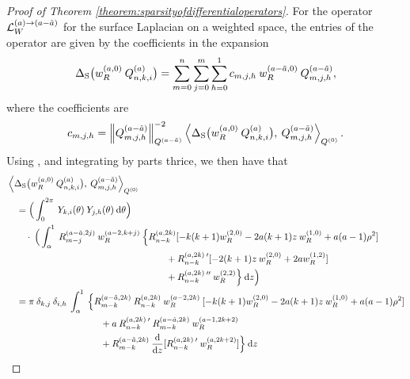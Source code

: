 \documentclass[11pt, oneside]{article}   	%
\begin{document}
\begin{proof}[Proof of Theorem \ref{theorem:sparsityofdifferentialoperators}]
For the operator $\mathcal{L}_W^{(a)\to(a-\tilde a)}$ for the surface Laplacian on a weighted space, the entries of the operator are given by the coefficients in the expansion 
\begin{align*}
	\Delta_{\rm S} \big(w_R^{(a,0)} \: Q_{n,k,i}^{(a)} \big) = \sum_{m=0}^{n} \sum_{j=0}^m \sum_{h=0}^1 c_{m,j,h} \: w_R^{(a-\tilde a,0)} \: Q_{m,j,h}^{(a - \tilde a)}, 
\end{align*}	
where the coefficients are
\begin{align*}
	c_{m,j,h} = \norm{\scopmjh^{(a - \tilde a)}}^{-2}_{\scop^{(a - \tilde a)}} \ip<\DeltaS \big(\genjacw^{(a,0)} \: \scopnki^{(a)} \big), \: \scopmjh^{(a - \tilde a)}>_{\scop^{(0)}}.
\end{align*}
Using , and integrating by parts thrice, we then have that
\begin{align*}
	&\ip<\DeltaS \big(\genjacw^{(a,0)} \: \scopnki^{(a)} \big), \: \scopmjh^{(a - \tilde a)}>_{\scop^{(0)}} \\
	&\quad = \Big( \int_0^{2\pi} \: \chki(\theta) \: \chjh(\theta) \: \D \theta \Big) \\
	&\quad \quad  \cdot \: \Big( \int_\alpha^1 \: \genjacmmj^{(a - \tilde a, 2j)} \: \genjacw^{(a - 2, k+j)} \: \Big\{\genjacnmk^{(a,2k)} [-k(k+1) \genjacw^{(2,0)} - 2a(k+1)z \: \genjacw^{(1,0)} + a (a-1) \rho^2] \\
	&\quad \quad \quad \quad \quad \quad \quad \quad \quad \quad \quad \quad \quad \quad \quad \quad \quad + \genjacnmk^{(a,2k) \: \prime} [-2(k+1) z \: \genjacw^{(2,0)} + 2a \genjacw^{(1,2)}] \\
	&\quad \quad \quad \quad \quad \quad \quad \quad \quad \quad \quad \quad \quad \quad \quad \quad \quad + \genjacnmk^{(a,2k) \: \prime \prime} \: \genjacw^{(2,2)} \Big\} \: \D z \Big) \\
	&\quad = \pi \: \delta_{k,j} \: \delta_{i,h} \: \int_\alpha^1 \: \Big\{ \genjac_{m-k}^{(a - \tilde a, 2k)} \: \genjacnmk^{(a,2k)} \: \genjacw^{(a - 2, 2k)} \: [-k(k+1) \genjacw^{(2,0)} - 2a(k+1)z \: \genjacw^{(1,0)} + a (a-1) \rho^2] \\
	&\quad \quad \quad \quad \quad \quad \quad \quad \quad \quad + a \: \genjacnmk^{(a,2k) \: \prime} \: \genjac_{m-k}^{(a - \tilde a, 2k)} \: \genjacw^{(a - 1, 2k+2)} \\
	&\quad \quad \quad \quad \quad \quad \quad \quad \quad \quad + \genjac_{m-k}^{(a - \tilde a, 2k)} \: \ddx{z} [\genjacnmk^{(a,2k) \: \prime} \: \genjacw^{(a, 2k+2)}] \Big\} \: \D z \\

\end{align*}
\end{proof}
\end{document}
